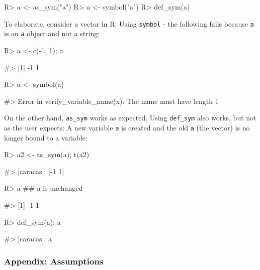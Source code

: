 \begin{Schunk}
\begin{Sinput}
R> a <- as_sym("a")
R> a <- symbol("a")
R> def_sym(a)
\end{Sinput}
\end{Schunk}

To elaborate, consider a vector in R: Using \texttt{symbol} - the
following fails because \texttt{a} is an \texttt{a} object and not a
string:

\begin{Schunk}
\begin{Sinput}
R> a <- c(-1, 1); a
\end{Sinput}
\begin{Soutput}
#> [1] -1  1
\end{Soutput}
\begin{Sinput}
R> a <- symbol(a)  
\end{Sinput}
\begin{Soutput}
#> Error in verify_variable_name(x): The name must have length 1
\end{Soutput}
\end{Schunk}

On the other hand, \texttt{as\_sym} works as expected. Using
\texttt{def\_sym} also works, but not as the user expects: A new
variable \texttt{a} is created and the old \texttt{a} (the vector) is no
longer bound to a variable:

\begin{Schunk}
\begin{Sinput}
R> a2 <- as_sym(a); t(a2)
\end{Sinput}
\begin{Soutput}
#> [caracas]: [-1  1]
\end{Soutput}
\begin{Sinput}
R> a  ## a is unchanged
\end{Sinput}
\begin{Soutput}
#> [1] -1  1
\end{Soutput}
\begin{Sinput}
R> def_sym(a); a
\end{Sinput}
\begin{Soutput}
#> [caracas]: a
\end{Soutput}
\end{Schunk}

\hypertarget{appendix-assumptions}{%
\subsubsection{Appendix: Assumptions}\label{appendix-assumptions}}

